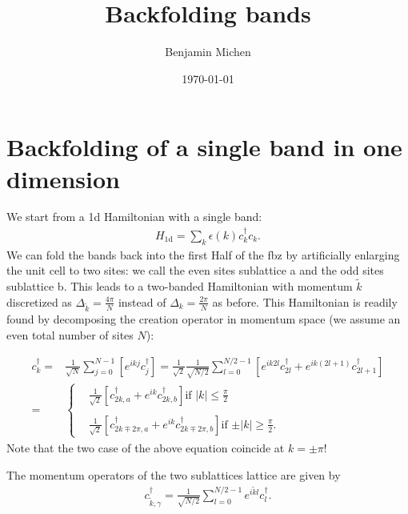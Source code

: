\documentclass[english]{scrartcl}
\title{Backfolding bands}
\author{Benjamin Michen}
\date{\today}
\begin{document}
\maketitle
{
\hypersetup{linkcolor=black}
\tableofcontents
}

\newpage

\section{Backfolding of a single band in one dimension}
We start from a \gls{1d} Hamiltonian with a single band:
\begin{align}
H_\mathrm{1d} = \sum_k \epsilon(k) c^\dagger_k c_k. \label{Eqn:H1d_generic}
\end{align}
We can fold the bands back into the first Half of the \gls{fbz} by artificially enlarging the unit cell to two sites: we call the even sites sublattice a and the odd sites sublattice b. This leads to a two-banded Hamiltonian with momentum $\tilde k$ discretized as $\Delta_{\tilde k} = \frac{4 \pi}{N}$ instead of $\Delta_{k} = \frac{2 \pi}{N}$ as before. This Hamiltonian is readily found by decomposing the creation operator in momentum space (we assume an even total number of sites $N$):

\begin{align}
c_k^\dagger =& \frac{1}{\sqrt{N}} \sum_{j = 0}^{N-1} \left [ e^{ik j} c_j^\dagger \right] = \frac{1}{\sqrt{2}} \frac{1}{\sqrt{N/2}} \sum_{l = 0}^{N/2 -1} \left [e^{ik 2l} c_{2l}^\dagger + e^{ik (2l + 1)} c_{2l + 1}^\dagger \right] \nonumber \\
=& \begin{cases}
&\frac{1}{\sqrt{2}}   \left [c_{2k, a}^\dagger  + e^{i k} c_{2k, b}^\dagger \right]  \text{if $|k| \leq \frac{\pi}{2}$} \\ \\
&\frac{1}{\sqrt{2}}   \left [c_{2k \mp 2 \pi, a}^\dagger  + e^{i k} c_{2k \mp 2 \pi, b}^\dagger \right]  \text{if $\pm|k| \geq \frac{\pi}{2}$}. 
\end{cases} \label{Eqn:c_k_backfolding}
\end{align}
Note that the two case of the above equation coincide at $k  =\pm \pi$!

The momentum operators of the two sublattices lattice are given by
\begin{align*}
c_{\tilde k, \gamma}^\dagger = \frac{1}{\sqrt{N/2}} \sum_{l = 0}^{N/2 - 1} e^{i \tilde k  l} c_l^\dagger.
\end{align*}
\end{document}
